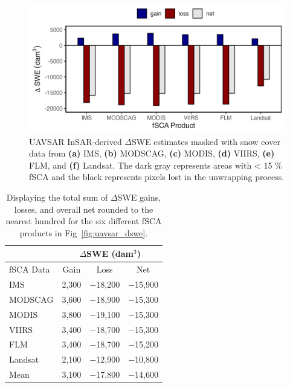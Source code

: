 \begin{figure}[t]
\centering
\label{fig:dswe_bar_graph}
\includegraphics[width=\textwidth]{figures/ch4_figs/dswe_stats_dam3_v1.png}
\caption{UAVSAR InSAR-derived $\Delta$SWE estimates masked with snow cover data from \textbf{(a)} IMS, \textbf{(b)} MODSCAG, \textbf{(c)} MODIS, \textbf{(d)} VIIRS, \textbf{(e)} FLM, and \textbf{(f)} Landsat. The dark gray represents areas with < 15 \% fSCA and the black represents pixels lost in the unwrapping process.}
\end{figure}

\begin{table}
\centering
\caption{Displaying the total sum of $\Delta$SWE gains, losses, and overall net rounded to the nearest hundred for the six different fSCA products in Fig~\ref{fig:uavsar_dswe}.}
\label{tab:dswe_stats}
\begin{tabular}{lccc}
\toprule
& \multicolumn{3}{c}{$\Delta$SWE (dam$^{3}$)} \\
\midrule
fSCA Data & Gain & Loss & Net \\
\midrule
IMS & 2,300 & $-$18,200 & $-$15,900 \\
MODSCAG & 3,600 & $-$18,900 & $-$15,300 \\
MODIS & 3,800 & $-$19,100 & $-$15,300 \\
VIIRS & 3,400 & $-$18,700 & $-$15,300 \\
FLM & 3,400 & $-$18,700 & $-$15,200 \\
Landsat & 2,100 & $-$12,900 & $-$10,800 \\
\midrule
Mean & 3,100 & $-$17,800 & $-$14,600 \\
\bottomrule
\end{tabular}
\end{table}

